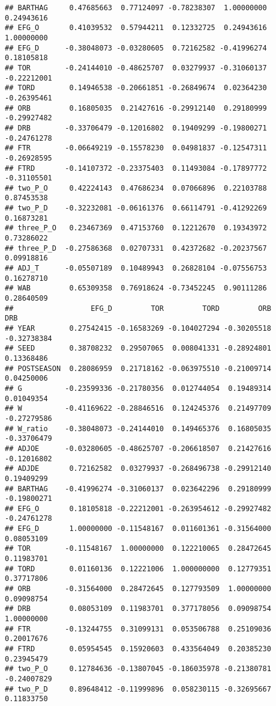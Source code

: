 \documentclass[
]{article}
\begin{document}
\begin{verbatim}
## BARTHAG     0.47685663  0.77124097 -0.78238307  1.00000000  0.24943616
## EFG_O       0.41039532  0.57944211  0.12332725  0.24943616  1.00000000
## EFG_D      -0.38048073 -0.03280605  0.72162582 -0.41996274  0.18105818
## TOR        -0.24144010 -0.48625707  0.03279937 -0.31060137 -0.22212001
## TORD        0.14946538 -0.20661851 -0.26849674  0.02364230 -0.26395461
## ORB         0.16805035  0.21427616 -0.29912140  0.29180999 -0.29927482
## DRB        -0.33706479 -0.12016802  0.19409299 -0.19800271 -0.24761278
## FTR        -0.06649219 -0.15578230  0.04981837 -0.12547311 -0.26928595
## FTRD       -0.14107372 -0.23375403  0.11493084 -0.17897772 -0.31105501
## two_P_O     0.42224143  0.47686234  0.07066896  0.22103788  0.87453538
## two_P_D    -0.32232081 -0.06161376  0.66114791 -0.41292269  0.16873281
## three_P_O   0.23467369  0.47153760  0.12212670  0.19343972  0.73286022
## three_P_D  -0.27586368  0.02707331  0.42372682 -0.20237567  0.09918816
## ADJ_T      -0.05507189  0.10489943  0.26828104 -0.07556753  0.16278710
## WAB         0.65309358  0.76918624 -0.73452245  0.90111286  0.28640509
##                  EFG_D         TOR         TORD         ORB         DRB
## YEAR        0.27542415 -0.16583269 -0.104027294 -0.30205518 -0.32738384
## SEED        0.38708232  0.29507065  0.008041331 -0.28924801  0.13368486
## POSTSEASON  0.28086959  0.21718162 -0.063975510 -0.21009714  0.04250006
## G          -0.23599336 -0.21780356  0.012744054  0.19489314  0.01049354
## W          -0.41169622 -0.28846516  0.124245376  0.21497709 -0.27279586
## W_ratio    -0.38048073 -0.24144010  0.149465376  0.16805035 -0.33706479
## ADJOE      -0.03280605 -0.48625707 -0.206618507  0.21427616 -0.12016802
## ADJDE       0.72162582  0.03279937 -0.268496738 -0.29912140  0.19409299
## BARTHAG    -0.41996274 -0.31060137  0.023642296  0.29180999 -0.19800271
## EFG_O       0.18105818 -0.22212001 -0.263954612 -0.29927482 -0.24761278
## EFG_D       1.00000000 -0.11548167  0.011601361 -0.31564000  0.08053109
## TOR        -0.11548167  1.00000000  0.122210065  0.28472645  0.11983701
## TORD        0.01160136  0.12221006  1.000000000  0.12779351  0.37717806
## ORB        -0.31564000  0.28472645  0.127793509  1.00000000  0.09098754
## DRB         0.08053109  0.11983701  0.377178056  0.09098754  1.00000000
## FTR        -0.13244755  0.31099131  0.053506788  0.25109036  0.20017676
## FTRD        0.05954545  0.15920603  0.433564049  0.20385230  0.23945479
## two_P_O     0.12784636 -0.13807045 -0.186035978 -0.21380781 -0.24007829
## two_P_D     0.89648412 -0.11999896  0.058230115 -0.32695667  0.11833750

\end{verbatim}
\end{document}
